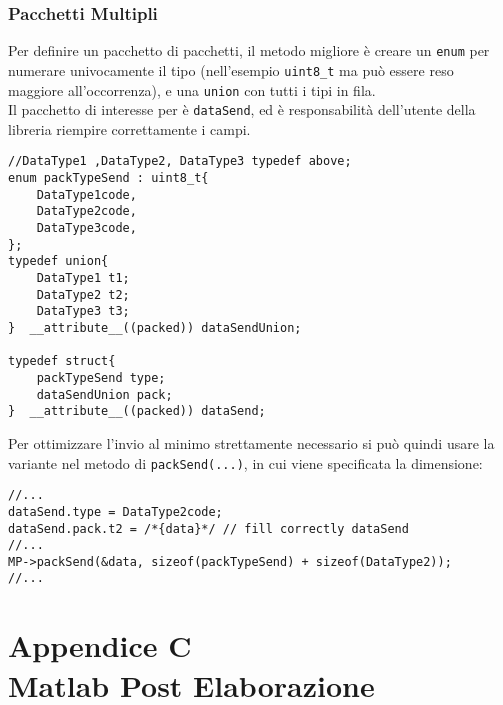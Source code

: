 \subsection{Pacchetti Multipli}
Per definire un pacchetto di pacchetti, il metodo migliore è creare un \verb|enum| per numerare univocamente il tipo (nell'esempio \verb|uint8_t| ma può essere reso maggiore all'occorrenza), e una \verb|union| con tutti i tipi in fila.\\
Il pacchetto di interesse per  è \verb|dataSend|, ed è responsabilità dell'utente della libreria riempire correttamente i campi.\\
\begin{lstlisting}[style=cppStyle,caption={definizione Pacchetti Multipli},label=lst:EMPmultiplePack] 
//DataType1 ,DataType2, DataType3 typedef above;
enum packTypeSend : uint8_t{
	DataType1code,
	DataType2code,
	DataType3code,
};
typedef union{
	DataType1 t1;
	DataType2 t2;
	DataType3 t3;
}  __attribute__((packed)) dataSendUnion;

typedef struct{
	packTypeSend type;
	dataSendUnion pack;
}  __attribute__((packed)) dataSend;
\end{lstlisting}
\noindent
Per ottimizzare l'invio al minimo strettamente necessario si può quindi usare la variante nel metodo di \verb|packSend(...)|, in cui viene specificata la dimensione:

\begin{lstlisting}[style=cppStyle,caption={definizione Pacchetti Multipli},label=lst:EMPsendOptimize] 
//...
dataSend.type = DataType2code;
dataSend.pack.t2 = /*{data}*/ // fill correctly dataSend
//...    
MP->packSend(&data, sizeof(packTypeSend) + sizeof(DataType2));
//...

\end{lstlisting}
\chapter*{Appendice C\\ Matlab Post Elaborazione}\label{MatlabCode}
\setcounter{chapter}{\thechapter + 1}